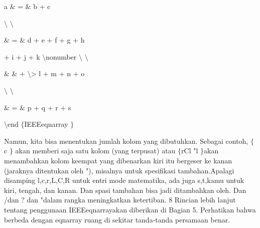 \vspace{12pt}
\noindent 
a  $  \&  $ =  $  \&  $ b + c \par
\vspace{12pt}
\noindent 
 $  \setminus  $ $  \setminus  $ \par
\vspace{12pt}
\noindent 
 $  \&  $ =  $  \&  $ d + e + f + g + h \par
\vspace{12pt}
\noindent 
+ i + j + k  $  \setminus  $nonumber $  \setminus  $ $  \setminus  $ \par
\vspace{12pt}
\noindent 
 $  \&  $ $  \&  $ + $  \setminus  $> l + m + n + o \par
\vspace{12pt}
\noindent 
 $  \setminus  $ $  \setminus  $ \par
\vspace{12pt}
\noindent 
 $  \&  $ =  $  \&  $ p + q + r + s \par
\vspace{12pt}
\noindent 
 $  \setminus  $end $  \{  $IEEEeqnarray $  \}  $ \par
\vspace{12pt}
\vspace{16pt}
\noindent 
 \hspace*{0.5in} Namun, kita bisa menentukan jumlah kolom yang dibutuhkan. Sebagai contoh,  $  \{  $c $  \}  $ akan memberi saja satu kolom (yang terpusat) atau  $  \{  $rCl "l $  \}  $akan menambahkan kolom keempat yang dibenarkan kiri itu bergeser ke kanan (jaraknya ditentukan oleh "), misalnya untuk spesifikasi tambahan.Apalagi disamping l,c,r,L,C,R untuk entri mode matematika, ada juga s,t,kamu untuk kiri, tengah, dan kanan. Dan spasi tambahan bisa jadi ditambahkan oleh. Dan /dan ? dan "dalam rangka meningkatkan ketertiban. 8 Rincian lebih lanjut tentang penggunaan IEEEeqnarrayakan diberikan di Bagian 5. Perhatikan bahwa berbeda dengan eqnarray ruang di sekitar tanda-tanda persamaan benar. \par
\vspace{20pt}
\noindent 
